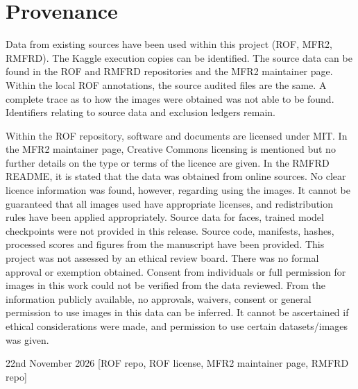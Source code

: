 \documentclass[10pt,lettersize,journal]{IEEEtran}
\begin{document}
\section{Provenance}

Data from existing sources have been used within this project (ROF, MFR2, RMFRD). The Kaggle execution copies can be identified. The source data can be found in the ROF and RMFRD repositories and the MFR2 maintainer page. Within the local ROF annotations, the source audited files are the same. A complete trace as to how the images were obtained was not able to be found. Identifiers relating to source data and exclusion ledgers remain.\par

Within the ROF repository, software and documents are licensed under MIT. In the MFR2 maintainer page, Creative Commons licensing is mentioned but no further details on the type or terms of the licence are given. In the RMFRD README, it is stated that the data was obtained from online sources. No clear licence information was found, however, regarding using the images. It cannot be guaranteed that all images used have appropriate licenses, and redistribution rules have been applied appropriately. Source data for faces, trained model checkpoints were not provided in this release. Source code, manifests, hashes, processed scores and figures from the manuscript have been provided. This project was not assessed by an ethical review board. There was no formal approval or exemption obtained. Consent from individuals or full permission for images in this work could not be verified from the data reviewed. From the information publicly available, no approvals, waivers, consent or general permission to use images in this data can be inferred. It cannot be ascertained if ethical considerations were made, and permission to use certain datasets/images was given.\par

22nd November 2026 [ROF repo, ROF license, MFR2 maintainer page, RMFRD repo]\par
\end{document}
